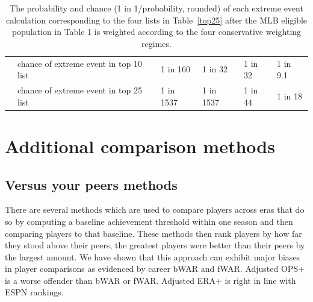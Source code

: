 \documentclass[11pt]{article}\usepackage[]{graphicx}\usepackage[]{color}
\begin{document}
\begin{table}[h!]
\begin{center}
\begin{tabular}{llllll}
& chance of extreme event in top 10 list 
  & 1 in 160 
  & 1 in 32 
  & 1 in 32 
  & 1 in 9.1 \\
& chance of extreme event in top 25 list 
  & 1 in 1537 
  & 1 in 1537 
  & 1 in 44 
  & 1 in 18 \\
  \hline
\end{tabular}
\end{center}
\caption{The probability and chance (1 in 1/probability, rounded) 
  of each extreme event calculation corresponding to the four lists in 
  Table~\ref{top25} after the MLB eligible population in Table 1 is 
  weighted according to the four conservative weighting regimes.}
\label{probvalues.weights}
\end{table}



\section{Additional comparison methods}




\subsection{Versus your peers methods}
\label{WARcritique}

There are several methods which are used to compare players across eras that 
do so by computing a baseline achievement threshold within one season and then 
comparing players to that baseline.  These methods then rank players by how far 
they stood above their peers, the greatest players were better than their peers 
by the largest amount. 
We have shown that this approach can exhibit major biases in player comparisons 
as evidenced by career bWAR and fWAR.  Adjusted OPS+ is a worse offender 
than bWAR or fWAR.  Adjusted ERA+ is right in line with ESPN rankings.
\end{document}
